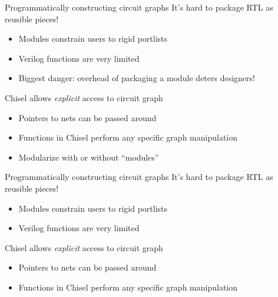 \documentclass{beamer}
\begin{document}
\begin{frame}{Programmatically constructing circuit graphs}
  It's hard to package RTL as reusible pieces!
  \begin{itemize}
  \item Modules constrain users to rigid portlists
  \item Verilog functions are very limited
  \item Biggest danger: overhead of packaging a module deters designers!
  \end{itemize}
  \vspace*{10mm}
  Chisel allows \textit{explicit} access to circuit graph
  \begin{itemize}
  \item Pointers to nets can be passed around
  \item Functions in Chisel perform any specific graph manipulation
  \item Modularize with or without ``modules''
  \end{itemize}
\end{frame}

\begin{frame}{Programmatically constructing circuit graphs}
  It's hard to package RTL as reusible pieces!
  \begin{itemize}
  \item Modules constrain users to rigid portlists
  \item Verilog functions are very limited
  \end{itemize}
  \vspace*{10mm}
  Chisel allows \textit{explicit} access to circuit graph
  \begin{itemize}
  \item Pointers to nets can be passed around
  \item Functions in Chisel perform any specific graph manipulation
  \end{itemize}
\end{frame}
\end{document}

